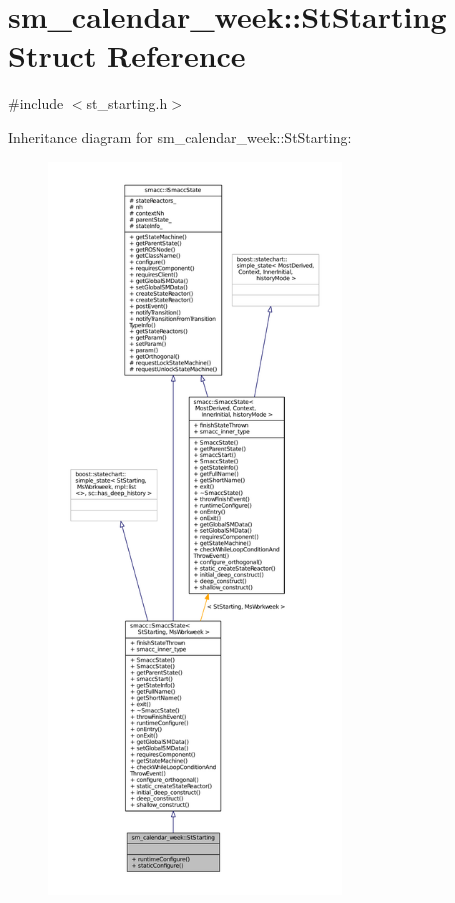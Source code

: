 \hypertarget{structsm__calendar__week_1_1StStarting}{}\section{sm\+\_\+calendar\+\_\+week\+:\+:St\+Starting Struct Reference}
\label{structsm__calendar__week_1_1StStarting}


{\ttfamily \#include $<$st\+\_\+starting.\+h$>$}



Inheritance diagram for sm\+\_\+calendar\+\_\+week\+:\+:St\+Starting\+:
\nopagebreak
\begin{figure}[H]
\begin{center}
\leavevmode
\includegraphics[height=550pt]{structsm__calendar__week_1_1StStarting__inherit__graph}
\end{center}
\end{figure}


